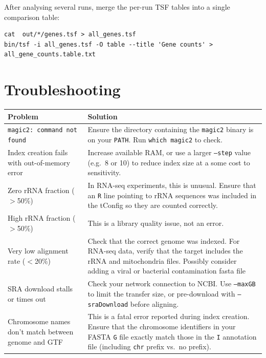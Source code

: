 \documentclass[11pt]{article}
\newcommand{\code}[1]{\texttt{#1}}
\begin{document}
After analysing several runs, merge the per-run TSF tables into a
single comparison table:
\begin{lstlisting}
cat  out/*/genes.tsf > all_genes.tsf
bin/tsf -i all_genes.tsf -O table --title 'Gene counts' > all_gene_counts.table.txt
\end{lstlisting}

\section{Troubleshooting}

\begin{center}
\begin{longtable}{p{5.5cm} p{9cm}}
\toprule
\textbf{Problem} & \textbf{Solution} \\
\midrule
\endhead

\code{magic2: command not found}
  & Ensure the directory containing the \code{magic2} binary is on your
    \code{PATH}.  Run \code{which magic2} to check. \\[4pt]

Index creation fails with out-of-memory error
  & Increase available RAM, or use a larger \code{--step} value (e.g.\
    8 or 10) to reduce index size at a some cost to sensitivity. \\[4pt]

Zero rRNA fraction ($>$50\%)
  & In RNA-seq experiments, this is unusual.  Ensure that an
    \code{R} line pointing to rRNA sequences was included in the
    tConfig so they are counted correctly. \\[4pt]

High rRNA fraction ($>$50\%)
  & This is a library quality issue, not an error. \\[4pt]

Very low alignment rate ($<$20\%)
  & Check that the correct genome was indexed.  For RNA-seq data,
    verify that the target includes the rRNA and mitochondria files.
    Possibly consider adding a viral or bacterial contamination fasta file \\[4pt]

SRA download stalls or times out
  & Check your network connection to NCBI.  Use \code{--maxGB} to
    limit the transfer size, or pre-download with \code{--sraDownload}
    before aligning. \\[4pt]

Chromosome names don't match between genome and GTF
  & This is a fatal error reported during index creation.
    Ensure that the chromosome identifiers in your FASTA \code{G} file
    exactly match those in the \code{I} annotation file (including
    \code{chr} prefix vs.\ no prefix). \\[4pt]


\end{longtable}
\end{center}
\end{document}
